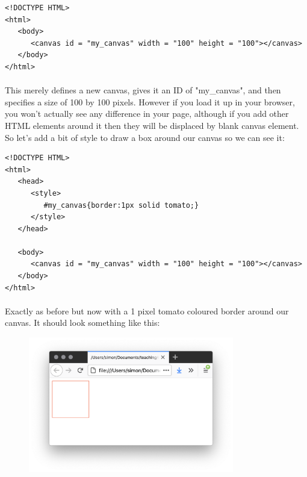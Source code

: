 \begin{lstlisting}
<!DOCTYPE HTML>
<html>
   <body>
      <canvas id = "my_canvas" width = "100" height = "100"></canvas>
   </body>
</html>
\end{lstlisting}

\paragraph{} This merely defines a new canvas, gives it an ID of "my\_canvas", and then specifies a size of 100 by 100 pixels. However if you load it up in your browser, you won't actually see any difference in your page, although if you add other HTML elements around it then they will be displaced by blank canvas element. So let's add a bit of style to draw a box around our canvas so we can see it:

\begin{lstlisting}
<!DOCTYPE HTML>
<html>
   <head>
      <style>
         #my_canvas{border:1px solid tomato;}
      </style>
   </head>
   
   <body>
      <canvas id = "my_canvas" width = "100" height = "100"></canvas>
   </body>
</html>
\end{lstlisting}

\paragraph{} Exactly as before but now with a 1 pixel tomato coloured border around our canvas. It should look something like this:

\begin{figure}[H]
\centering
\includegraphics[width=0.8\textwidth]{figures/canvas}
\label{fig:canvas}
\caption{}
\end{figure}



